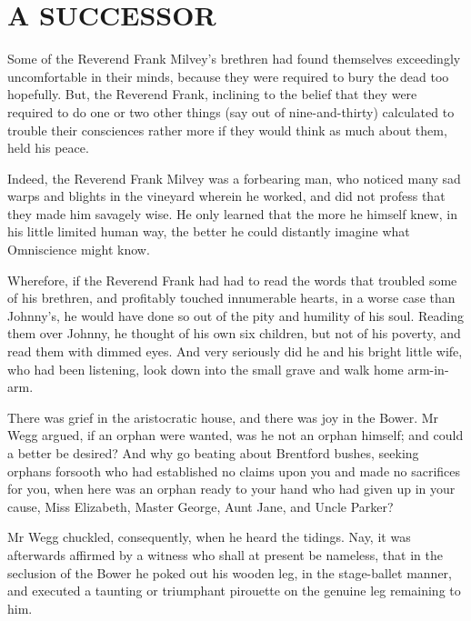 
\chapter{A SUCCESSOR}

Some of the Reverend Frank Milvey’s brethren had found themselves
exceedingly uncomfortable in their minds, because they were required to
bury the dead too hopefully. But, the Reverend Frank, inclining to the
belief that they were required to do one or two other things (say out of
nine-and-thirty) calculated to trouble their consciences rather more if
they would think as much about them, held his peace.

Indeed, the Reverend Frank Milvey was a forbearing man, who noticed many
sad warps and blights in the vineyard wherein he worked, and did not
profess that they made him savagely wise. He only learned that the more
he himself knew, in his little limited human way, the better he could
distantly imagine what Omniscience might know.

Wherefore, if the Reverend Frank had had to read the words that troubled
some of his brethren, and profitably touched innumerable hearts, in
a worse case than Johnny’s, he would have done so out of the pity and
humility of his soul. Reading them over Johnny, he thought of his own
six children, but not of his poverty, and read them with dimmed eyes.
And very seriously did he and his bright little wife, who had been
listening, look down into the small grave and walk home arm-in-arm.

There was grief in the aristocratic house, and there was joy in the
Bower. Mr Wegg argued, if an orphan were wanted, was he not an orphan
himself; and could a better be desired? And why go beating about
Brentford bushes, seeking orphans forsooth who had established no claims
upon you and made no sacrifices for you, when here was an orphan ready
to your hand who had given up in your cause, Miss Elizabeth, Master
George, Aunt Jane, and Uncle Parker?

Mr Wegg chuckled, consequently, when he heard the tidings. Nay, it was
afterwards affirmed by a witness who shall at present be nameless,
that in the seclusion of the Bower he poked out his wooden leg, in the
stage-ballet manner, and executed a taunting or triumphant pirouette on
the genuine leg remaining to him.

